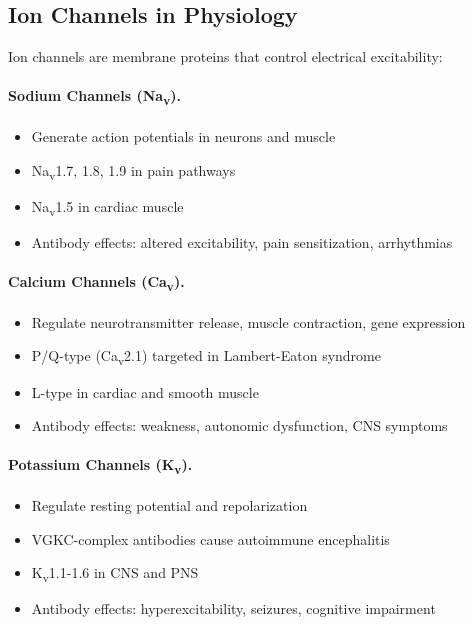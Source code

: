 \subsection{Ion Channels in Physiology}

Ion channels are membrane proteins that control electrical excitability:

\paragraph{Sodium Channels (Na\textsubscript{v}).}
\begin{itemize}
    \item Generate action potentials in neurons and muscle
    \item Na\textsubscript{v}1.7, 1.8, 1.9 in pain pathways
    \item Na\textsubscript{v}1.5 in cardiac muscle
    \item Antibody effects: altered excitability, pain sensitization, arrhythmias
\end{itemize}

\paragraph{Calcium Channels (Ca\textsubscript{v}).}
\begin{itemize}
    \item Regulate neurotransmitter release, muscle contraction, gene expression
    \item P/Q-type (Ca\textsubscript{v}2.1) targeted in Lambert-Eaton syndrome
    \item L-type in cardiac and smooth muscle
    \item Antibody effects: weakness, autonomic dysfunction, CNS symptoms
\end{itemize}

\paragraph{Potassium Channels (K\textsubscript{v}).}
\begin{itemize}
    \item Regulate resting potential and repolarization
    \item VGKC-complex antibodies cause autoimmune encephalitis
    \item K\textsubscript{v}1.1-1.6 in CNS and PNS
    \item Antibody effects: hyperexcitability, seizures, cognitive impairment
\end{itemize}

